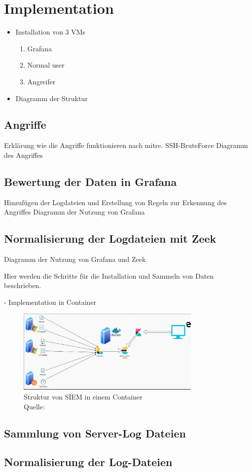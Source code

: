 \section{Implementation}

\begin{itemize}[noitemsep]
   \item	Installation von 3 VMs
   \begin{enumerate}[noitemsep]
      \item Grafana
      \item Normal user
      \item Angreifer
   \end{enumerate}
   \item	Diagramm der Struktur
\end{itemize}

\subsection{Angriffe}
Erklärung wie die Angriffe funktionieren nach \gls{mitre}.
SSH-BruteForce
Diagramm des Angriffes

\subsection{Bewertung der Daten in Grafana}
Hinzufügen der Logdateien und Erstellung von Regeln zur Erkennung des Angriffes
Diagramm der Nutzung von Grafana

\subsection{Normalisierung der Logdateien mit Zeek}
Diagramm der Nutzung von Grafana und Zeek

Hier werden die Schritte für die Installation und Sammeln von Daten beschrieben.

- Implementation in Container %
\begin{figure}[H]
   \centering
   \includegraphics[width=0.8\textwidth]{assets/3_p1.png}
   \caption{Struktur von \gls{SIEM} in einem Container \\Quelle: \citep{RDR_Docker}}
   \centering
\end{figure}


\subsection{Sammlung von Server-Log Dateien}

\subsection{Normalisierung der Log-Dateien}





